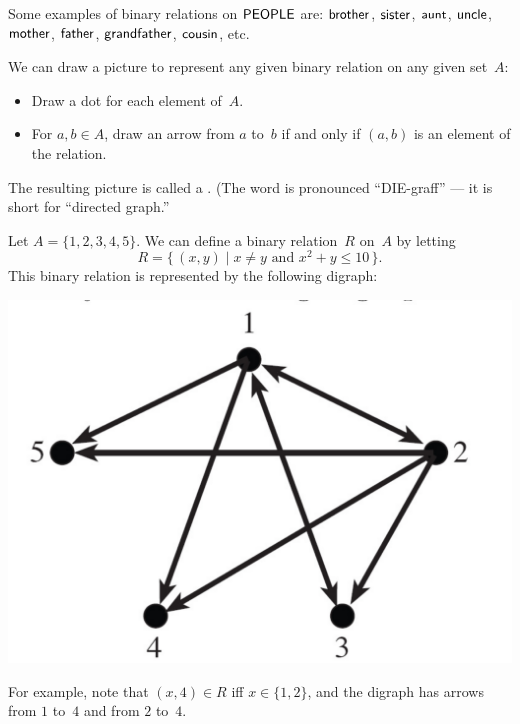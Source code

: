 \begin{eg} 
Some examples of binary relations on $\sf{PEOPLE}$ are:
$\sf{brother}$, $\sf{sister}$, $\sf{aunt}$, $\sf{uncle}$, $\sf{mother}$, $\sf{father}$, $\sf{grandfather}$, $\sf{cousin}$, etc.
 \end{eg}

\begin{defn} \label{digraph} 
We can draw a picture to represent any given binary relation on any given set~$A$:
	\begin{itemize}
	\item Draw a dot for each element of~$A$.
	\item For $a,b \in A$, draw an arrow from $a$ to~$b$ if and only if $(a,b)$ is an element of the relation.
	\end{itemize} 
The resulting picture is called a . (The word is pronounced ``DIE-graff'' --- it is short for ``directed graph.''
\end{defn}
 
 \begin{eg}
 Let $A =  \{1,2,3,4,5\}$. We can define a binary relation~$R$ on~$A$ by letting
 	\[ R = \{\, (x,y) \mid x \neq y \text{ and } x^2 + y \leq 10 \,\} .\]
This binary relation is represented by the following digraph:
\\ \centerline{\includegraphics[scale=0.4]{images/x2+y.pdf}}
For example, note that $(x,4) \in R$ iff $x \in \{1,2\}$, and the digraph has arrows from $1$ to~$4$ and from $2$ to~$4$.
\end{eg}

